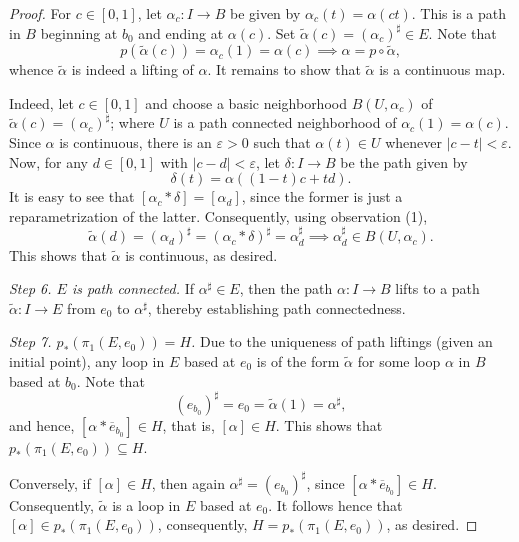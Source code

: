 \documentclass[10pt]{article}
\theoremstyle{thmstyle}
\theoremstyle{defstyle}
\newcommand{\wt}[1]{\widetilde{#1}}
\begin{document}
\begin{proof}
For $c\in[0, 1]$, let $\alpha_c: I\to B$ be given by $\alpha_c(t) = \alpha(ct)$. This is a path in $B$ beginning at $b_0$ and ending at $\alpha(c)$. Set $\wt\alpha(c) = (\alpha_c)^\sharp\in E$. Note that 
\begin{equation*}
    p\left(\wt\alpha(c)\right) = \alpha_c(1) = \alpha(c)\implies\alpha = p\circ\wt\alpha,
\end{equation*}
whence $\wt\alpha$ is indeed a lifting of $\alpha$. It remains to show that $\wt\alpha$ is a continuous map.

Indeed, let $c\in [0, 1]$ and choose a basic neighborhood $B(U,\alpha_c)$ of $\wt\alpha(c) = (\alpha_c)^\sharp$; where $U$ is a path connected neighborhood of $\alpha_c(1) = \alpha(c)$. Since $\alpha$ is continuous, there is an $\varepsilon > 0$ such that $\alpha(t)\in U$ whenever $|c - t| < \varepsilon$. Now, for any $d\in[0, 1]$ with $|c - d| < \varepsilon$, let $\delta: I\to B$ be the path given by 
\begin{equation*}
    \delta(t) = \alpha\left((1 - t)c + td\right).
\end{equation*}
It is easy to see that $[\alpha_c\ast\delta] = [\alpha_d]$, since the former is just a reparametrization of the latter. Consequently, using observation (1), 
\begin{equation*}
    \wt\alpha(d) = (\alpha_d)^\sharp = (\alpha_c\ast\delta)^\sharp = \alpha_d^\sharp\implies\alpha_d^\sharp\in B(U,\alpha_c).
\end{equation*}
This shows that $\wt\alpha$ is continuous, as desired.

\emph{Step 6. $E$ is path connected.} If $\alpha^\sharp\in E$, then the path $\alpha: I\to B$ lifts to a path $\wt\alpha: I\to E$ from $e_0$ to $\alpha^\sharp$, thereby establishing path connectedness.

\emph{Step 7. $p_\ast\left(\pi_1(E, e_0)\right) = H$.} Due to the uniqueness of path liftings (given an initial point), any loop in $E$ based at $e_0$ is of the form $\wt\alpha$ for some loop $\alpha$ in $B$ based at $b_0$. Note that $$(e_{b_0})^\sharp = e_0 = \wt\alpha(1) = \alpha^\sharp,$$
and hence, $[\alpha\ast\overline e_{b_0}]\in H$, that is, $[\alpha]\in H$. This shows that $p_\ast\left(\pi_1(E, e_0)\right)\subseteq H$.

Conversely, if $[\alpha]\in H$, then again $\alpha^\sharp = (e_{b_0})^\sharp$, since $[\alpha\ast\overline e_{b_0}]\in H$. Consequently, $\wt\alpha$ is a loop in $E$ based at $e_0$. It follows hence that $[\alpha]\in p_\ast\left(\pi_1(E, e_0)\right)$, consequently, $H = p_\ast\left(\pi_1(E, e_0)\right)$, as desired.
\end{proof}
\end{document}
